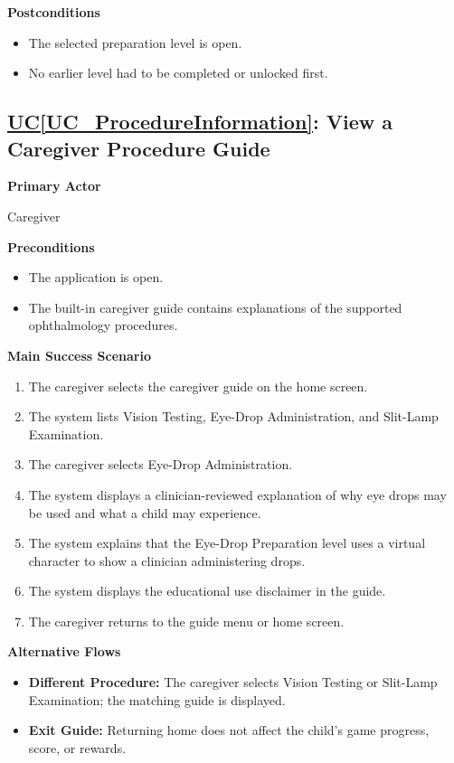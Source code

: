 \documentclass[12pt]{article}
\newcounter{ucnum} %
\newcommand{\ucref}[1]{\hyperref[#1]{UC\ref*{#1}}}
\begin{document}
\textbf{Postconditions}
\begin{itemize}
    \item The selected preparation level is open.
    \item No earlier level had to be completed or unlocked first.
\end{itemize}

\label{UC_ProcedureInformation}
\subsection{\ucref{UC_ProcedureInformation}: View a Caregiver Procedure Guide}

\textbf{Primary Actor}

Caregiver

\textbf{Preconditions}
\begin{itemize}
    \item The application is open.
    \item The built-in caregiver guide contains explanations of the
    supported ophthalmology procedures.
\end{itemize}

\textbf{Main Success Scenario}
\begin{enumerate}
    \item The caregiver selects the caregiver guide on the home screen.
    \item The system lists Vision Testing, Eye-Drop Administration,
    and Slit-Lamp Examination.
    \item The caregiver selects Eye-Drop Administration.
    \item The system displays a clinician-reviewed explanation of why
    eye drops may be used and what a child may experience.
    \item The system explains that the Eye-Drop Preparation level uses
    a virtual character to show a clinician administering drops.
    \item The system displays the educational use disclaimer in the guide.
    \item The caregiver returns to the guide menu or home screen.
\end{enumerate}

\textbf{Alternative Flows}
\begin{itemize}
    \item \textbf{Different Procedure:} The caregiver selects Vision
    Testing or Slit-Lamp Examination; the matching guide is displayed.
    \item \textbf{Exit Guide:} Returning home does not affect the
    child's game progress, score, or rewards.
\end{itemize}
\end{document}
